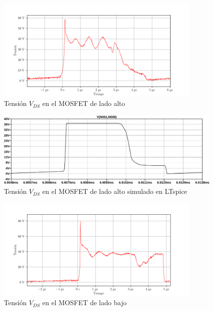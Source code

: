 \begin{figure}[H]
    \centering
    \includegraphics[width=0.9\textwidth]{images/capturas-osciloscopio/17-11-2022/33.png}
    \caption{Tensión $V_{DS}$ en el MOSFET de lado alto}
    \label{fig:vds_high}
\end{figure}

\begin{figure}[H]
    \centering
    \includegraphics[width=\textwidth]{images/sim/16.pdf}
    \caption{Tensión $V_{DS}$ en el MOSFET de lado alto simulado en LTspice}
    \label{fig:vds_simulation_high}
\end{figure}

\begin{figure}[H]
    \centering
    \includegraphics[width=0.9\textwidth]{images/capturas-osciloscopio/17-11-2022/36.png}
    \caption{Tensión $V_{DS}$ en el MOSFET de lado bajo}
    \label{fig:vds_low}
\end{figure}

